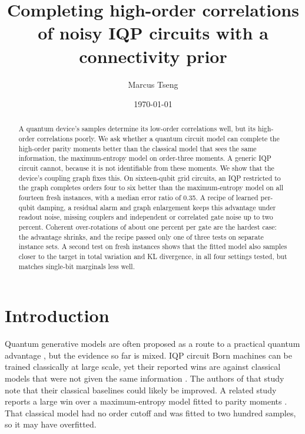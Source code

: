 \documentclass[aps,pra,twocolumn,superscriptaddress,nofootinbib]{revtex4-2}
\begin{document}
\title{Completing high-order correlations of noisy IQP circuits with a connectivity prior}

\author{Marcus Tseng}

\date{\today}

\begin{abstract}
A quantum device's samples determine its low-order correlations well, but its high-order correlations poorly.
We ask whether a quantum circuit model can complete the high-order parity moments better than the classical model
that sees the same information, the maximum-entropy model on order-three moments.
A generic IQP circuit cannot, because it is not identifiable from these moments.
We show that the device's coupling graph fixes this.
On sixteen-qubit grid circuits, an IQP restricted to the graph completes orders four to six better than the
maximum-entropy model on all fourteen fresh instances, with a median error ratio of 0.35.
A recipe of learned per-qubit damping, a residual alarm and graph enlargement keeps this advantage under readout noise,
missing couplers and independent or correlated gate noise up to two percent.
Coherent over-rotations of about one percent per gate are the hardest case: the advantage shrinks, and the recipe
passed only one of three tests on separate instance sets.
A second test on fresh instances shows that the fitted model also samples closer to the target in total variation
and KL divergence, in all four settings tested, but matches single-bit marginals less well.
\end{abstract}

\maketitle

\section{Introduction}

Quantum generative models are often proposed as a route to a practical quantum advantage
\cite{huang2025generative,hibatallah2024framework}, but the evidence so far is mixed.
IQP circuit Born machines can be trained classically at large scale, yet their reported wins are against classical
models that were not given the same information \cite{recio2025train}.
The authors of that study note that their classical baselines could likely be improved.
A related study reports a large win over a maximum-entropy model fitted to parity moments \cite{baumann2026parity}.
That classical model had no order cutoff and was fitted to two hundred samples, so it may have overfitted.
\end{document}
